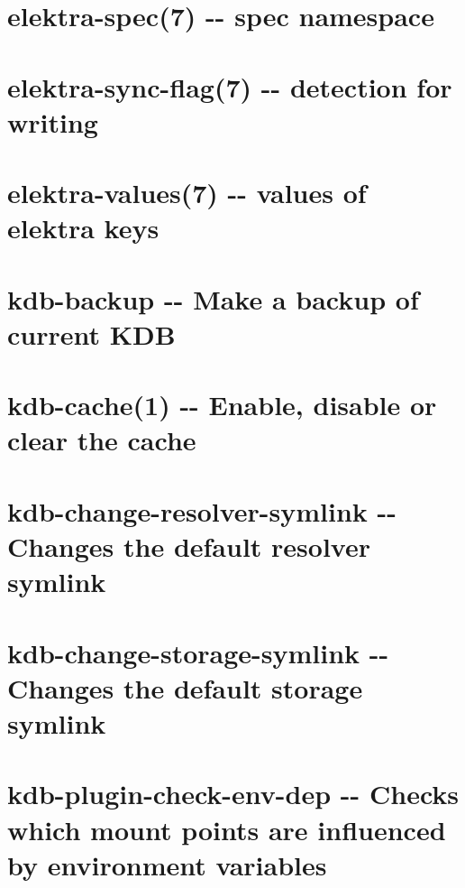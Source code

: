 \documentclass[twoside]{book}
\newcommand{\+}{\discretionary{\mbox{\scriptsize$\hookleftarrow$}}{}{}}
\begin{document}
\chapter{elektra-\/spec(7) -\/-\/ spec namespace}
\label{doc_help_elektra-spec_md}

\chapter{elektra-\/sync-\/flag(7) -\/-\/ detection for writing}
\label{doc_help_elektra-sync-flag_md}

\chapter{elektra-\/values(7) -\/-\/ values of elektra keys}
\label{doc_help_elektra-values_md}

\chapter{kdb-\/backup -\/-\/ Make a backup of current K\+DB}
\label{doc_help_kdb-backup_md}

\chapter{kdb-\/cache(1) -\/-\/ Enable, disable or clear the cache}
\label{doc_help_kdb-cache_md}

\chapter{kdb-\/change-\/resolver-\/symlink -\/-\/ Changes the default resolver symlink}
\label{doc_help_kdb-change-resolver-symlink_md}

\chapter{kdb-\/change-\/storage-\/symlink -\/-\/ Changes the default storage symlink}
\label{doc_help_kdb-change-storage-symlink_md}

\chapter{kdb-\/plugin-\/check-\/env-\/dep -\/-\/ Checks which mount points are influenced by environment variables}
\label{doc_help_kdb-check-env-dep_md}

\end{document}
